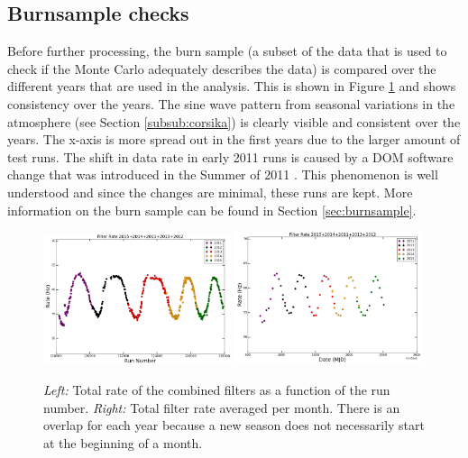 \subsection{Burnsample checks}
Before further processing, the burn sample (a subset of the data that is used to check if the Monte Carlo adequately describes the data) is compared over the different years that are used in the analysis. This is shown in Figure \ref{fig:burnsamplechecks} and shows consistency over the years. The sine wave pattern from seasonal variations in the atmosphere (see Section \ref{subsub:corsika}) is clearly visible and consistent over the years. The x-axis is more spread out in the first years due to the larger amount of test runs. The shift in data rate in early 2011 runs is caused by a DOM software change that was introduced in the Summer of 2011 \cite{2011rate}. This phenomenon is well understood and since the changes are minimal, these runs are kept.
More information on the burn sample can be found in Section \ref{sec:burnsample}.

\begin{figure}[t]
\centering
\includegraphics[width=0.49\textwidth]{chapter8/img/FilterRatePerRun.png}
\includegraphics[width=0.49\textwidth]{chapter8/img/FilterRatePerMonth.png}
\caption{\textit{Left: }Total rate of the combined filters as a function of the run number. \textit{Right: }Total filter rate averaged per month. There is an overlap for each year because a new season does not necessarily start at the beginning of a month.}
\label{fig:burnsamplechecks}
\end{figure}

